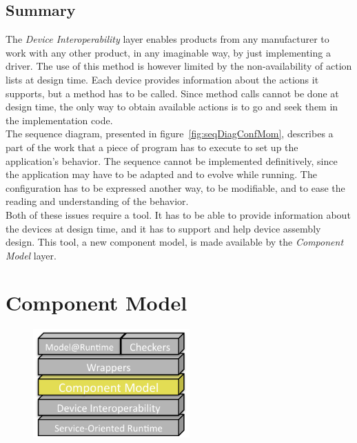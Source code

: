 \subsection{Summary}

The {\it Device Interoperability} layer enables products from any manufacturer to work with any other product, in any imaginable way, by just implementing a driver. The use of this method is however limited by the non-availability of action lists at design time. Each device provides information about the actions it supports, but a method has to be called. Since method calls cannot be done at design time, the only way to obtain available actions is to go and seek them in the implementation code.\\
The sequence diagram, presented in figure~\ref{fig:seqDiagConfMom}, describes a part of the work that a piece of program has to execute to set up the application's behavior. The sequence cannot be implemented definitively, since the application may have to be adapted and to evolve while running. The configuration has to be expressed another way, to be modifiable, and to ease the reading and understanding of the behavior.\\

Both of these issues require a tool. It has to be able to provide information about the devices at design time, and it has to support and help device assembly design. This tool, a new component model, is made available by the {\it Component Model} layer.

\newpage
\section{Component Model}
\label{sec:componentModel}
\begin{figure}
  \vspace{-8mm}
  \includegraphics[width=60mm]{part2/pics/layers/ComponentModel.pdf}
  \vspace{-8mm}
\end{figure}

